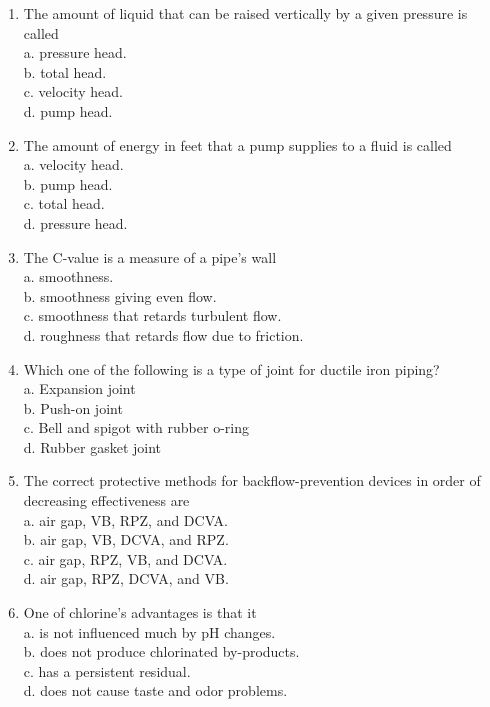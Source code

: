 \documentclass[10pt]{article}
\begin{document}
\begin{enumerate}
  \item The amount of liquid that can be raised vertically by a given pressure is called\\
a. pressure head.\\
b. total head.\\
c. velocity head.\\
d. pump head.

  \item The amount of energy in feet that a pump supplies to a fluid is called\\
a. velocity head.\\
b. pump head.\\
c. total head.\\
d. pressure head.

  \item The C-value is a measure of a pipe's wall\\
a. smoothness.\\
b. smoothness giving even flow.\\
c. smoothness that retards turbulent flow.\\
d. roughness that retards flow due to friction.

  \item Which one of the following is a type of joint for ductile iron piping?\\
a. Expansion joint\\
b. Push-on joint\\
c. Bell and spigot with rubber o-ring\\
d. Rubber gasket joint

  \item The correct protective methods for backflow-prevention devices in order of decreasing effectiveness are\\
a. air gap, VB, RPZ, and DCVA.\\
b. air gap, VB, DCVA, and RPZ.\\
c. air gap, RPZ, VB, and DCVA.\\
d. air gap, RPZ, DCVA, and VB.


  \item One of chlorine's advantages is that it\\
a. is not influenced much by $\mathrm{pH}$ changes.\\
b. does not produce chlorinated by-products.\\
c. has a persistent residual.\\
d. does not cause taste and odor problems.


\end{enumerate}
\end{document}

